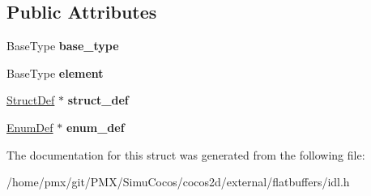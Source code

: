 \subsection*{Public Attributes}
\begin{DoxyCompactItemize}
\item 
\mbox{\label{structflatbuffers_1_1Type_a6ed0f3f3c32f8bee3ba0b8c8a7894ccb}} 
Base\+Type {\bfseries base\+\_\+type}
\item 
\mbox{\label{structflatbuffers_1_1Type_a21ecaff2c49a899a77f4fe9585717bb5}} 
Base\+Type {\bfseries element}
\item 
\mbox{\label{structflatbuffers_1_1Type_a7b5afa5229bf1088971f383e386ce0e5}} 
\hyperlink{structflatbuffers_1_1StructDef}{Struct\+Def} $\ast$ {\bfseries struct\+\_\+def}
\item 
\mbox{\label{structflatbuffers_1_1Type_a239045bac76079f6af8ad299b2be853b}} 
\hyperlink{structflatbuffers_1_1EnumDef}{Enum\+Def} $\ast$ {\bfseries enum\+\_\+def}
\end{DoxyCompactItemize}


The documentation for this struct was generated from the following file\+:\begin{DoxyCompactItemize}
\item 
/home/pmx/git/\+P\+M\+X/\+Simu\+Cocos/cocos2d/external/flatbuffers/idl.\+h\end{DoxyCompactItemize}
